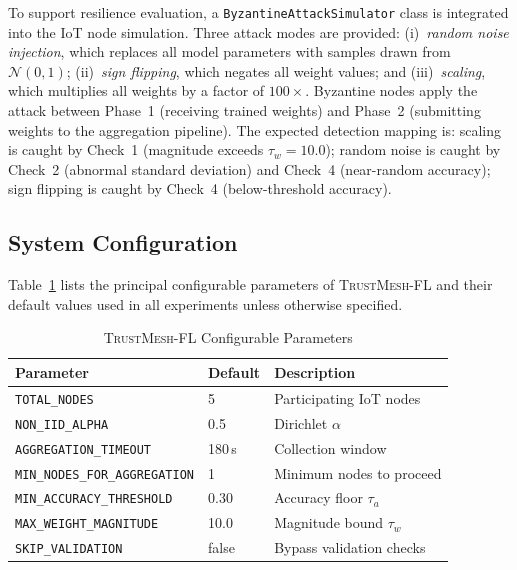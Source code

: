 \documentclass[lettersize,journal]{IEEEtran}
\newcommand{\tmfl}{\textsc{TrustMesh-FL}}
\begin{document}
To support resilience evaluation, a \texttt{ByzantineAttackSimulator} class is integrated
into the IoT node simulation. Three attack modes are provided:
(i)~\textit{random noise injection}, which replaces all model parameters with samples
drawn from $\mathcal{N}(0, 1)$;
(ii)~\textit{sign flipping}, which negates all weight values; and
(iii)~\textit{scaling}, which multiplies all weights by a factor of $100\times$.
Byzantine nodes apply the attack between Phase~1 (receiving trained weights) and Phase~2
(submitting weights to the aggregation pipeline). The expected detection mapping is: scaling
is caught by Check~1 (magnitude exceeds $\tau_w = 10.0$); random noise is caught by
Check~2 (abnormal standard deviation) and Check~4 (near-random accuracy); sign flipping
is caught by Check~4 (below-threshold accuracy).

\subsection{System Configuration}

Table~\ref{tab:config} lists the principal configurable parameters of \tmfl{} and their
default values used in all experiments unless otherwise specified.

\begin{table}[t]
\centering
\caption{\tmfl{} Configurable Parameters}
\label{tab:config}
\footnotesize
\setlength{\tabcolsep}{3pt}
\begin{tabular}{lll}
\toprule
Parameter & Default & Description \\
\midrule
\texttt{TOTAL\_NODES}                 & 5     & Participating IoT nodes \\
\texttt{NON\_IID\_ALPHA}              & 0.5   & Dirichlet $\alpha$ \\
\texttt{AGGREGATION\_TIMEOUT}         & 180\,s & Collection window \\
\texttt{MIN\_NODES\_FOR\_AGGREGATION} & 1     & Minimum nodes to proceed \\
\texttt{MIN\_ACCURACY\_THRESHOLD}     & 0.30  & Accuracy floor $\tau_a$ \\
\texttt{MAX\_WEIGHT\_MAGNITUDE}       & 10.0  & Magnitude bound $\tau_w$ \\
\texttt{SKIP\_VALIDATION}             & false & Bypass validation checks \\
\bottomrule
\end{tabular}
\end{table}

\end{document}
